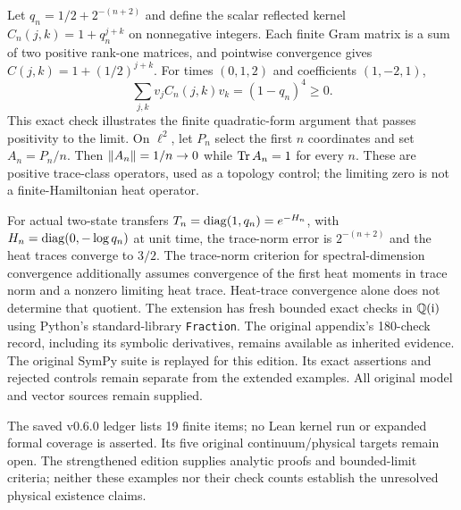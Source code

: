 Let $q_n=1/2+2^{-(n+2)}$ and define the scalar reflected kernel $C_n(j,k)=1+q_n^{j+k}$ on nonnegative integers. Each finite Gram matrix is a sum of two positive rank-one matrices, and pointwise convergence gives $C(j,k)=1+(1/2)^{j+k}$. For times $(0,1,2)$ and coefficients $(1,-2,1)$,
\[
\sum_{j,k}v_jC_n(j,k)v_k=(1-q_n)^4\geq0.
\]
This exact check illustrates the finite quadratic-form argument that passes positivity to the limit.
On $\ell^2$, let $P_n$ select the first $n$ coordinates and set $A_n=P_n/n$. Then $\left\lVert A_n\right\rVert=1/n\to0$ while $\operatorname{Tr} A_n=1$ for every $n$. These are positive trace-class operators, used as a topology control; the limiting zero is not a finite-Hamiltonian heat operator.

For actual two-state transfers $T_n=\operatorname{diag}(1,q_n)=e^{-H_n}$, with $H_n=\operatorname{diag}(0,-\log q_n)$ at unit time, the trace-norm error is $2^{-(n+2)}$ and the heat traces converge to $3/2$. The trace-norm criterion for spectral-dimension convergence additionally assumes convergence of the first heat moments in trace norm and a nonzero limiting heat trace. Heat-trace convergence alone does not determine that quotient.
The extension has fresh bounded exact checks in $\mathbb Q(\mathrm i)$ using Python's standard-library \texttt{Fraction}. The original appendix's 180-check record, including its symbolic derivatives, remains available as inherited evidence. The original SymPy suite is replayed for this edition. Its exact assertions and rejected controls remain separate from the extended examples. All original model and vector sources remain supplied.

The saved v0.6.0 ledger lists 19 finite items; no Lean kernel run or expanded formal coverage is asserted. Its five original continuum/physical targets remain open. The strengthened edition supplies analytic proofs and bounded-limit criteria; neither these examples nor their check counts establish the unresolved physical existence claims.
